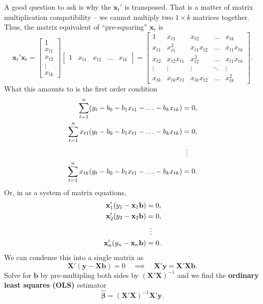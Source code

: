 \documentclass[12pt]{article}
\renewcommand{\vec}[1]{\mathbf{#1}}
\renewcommand{\hat}[1]{\widehat{#1}}
\newcommand{\Limplies}{\quad \implies \quad}
\theoremstyle{definition}
\begin{document}
A good question to ask is why the $\vec{x}_t'$ is transposed. That is a matter of matrix multiplication compatibility -- we cannot multiply two $1 \times k$ matrices together. Thus, the matrix equivalent of ``pre-squaring'' $\vec{x}_t$ is
	\[  \vec{x}_t' \vec{x}_t = 
		\begin{bmatrix}
		1 \\ x_{t1} \\ x_{t2} \\ \vdots \\ x_{tk} 
		\end{bmatrix}
		\begin{bmatrix}
			1 & x_{t1} & x_{t2} & \hdots & x_{tk}   
		\end{bmatrix}=
		\begin{bmatrix}
			1 & x_{t1} & x_{t2} & \hdots & x_{tk} \\
			x_{t1} & x_{t1}^2 & x_{t1}x_{t2} & \hdots & x_{t1}x_{tk} \\
			x_{t2} & x_{t2}x_{t1} & x_{t2}^2 & \hdots & x_{t1}x_{tk} \\
			\vdots & \vdots & \vdots & \ddots & \vdots \\
			x_{tk} & x_{tk}x_{t1} & x_{tk}x_{t2} & \hdots & x_{tk}^2
		\end{bmatrix}.
	\]	
What this amounts to is the first order condition
\begin{align*}
	\sum_{t=1}^n (y_t - b_0 - b_1x_{t1} - \hdots - b_kx_{tk})&=0,\\
	\sum_{t=1}^n x_{t1} (y_t - b_0 - b_1x_{t1} - \hdots - b_kx_{tk})&=0,\\
	&\mathrel{\makebox[\widthof{=}]{\vdots}} \\ 
 	\sum_{t=1}^n x_{tk} (y_t - b_0 - b_1x_{t1} - \hdots - b_kx_{tk})&=0.
\end{align*}
Or, in as a system of matrix equations,
\begin{align*}
	 \vec{x}'_1(y_1 - \vec{x}_1 \vec{b}) &=0, \\
 	 \vec{x}'_2(y_2 - \vec{x}_2 \vec{b}) &=0, \\
 	 &\mathrel{\makebox[\widthof{=}]{\vdots}} \\
 	 \vec{x}'_n(y_n - \vec{x}_n \vec{b}) &=0. 
\end{align*}
We can condense this into a single matrix as
\begin{equation}
	\vec{X}'(\vec{y} - \vec{X}\vec{b})=0	\Limplies \vec{X}'\vec{y} = \vec{X}'\vec{X}\vec{b}.	\label{olsmatrix}
\end{equation}
Solve for $\vec{b}$ by  pre-multipling both sides by $(\vec{X'X})^{-1}$  and we find the \textbf{ordinary least squares (OLS)} estimator 
\begin{equation}
	\bm{\hat{\beta}}  = (\vec{X'X})^{-1}\vec{X}'\vec{y}.	\label{olsestimator}
\end{equation}
\end{document}
